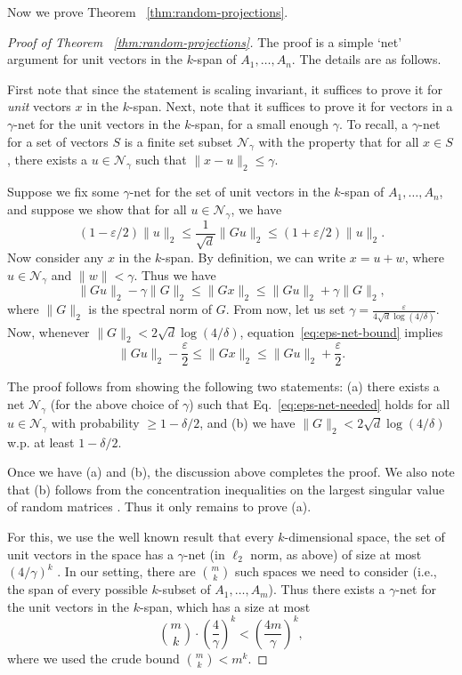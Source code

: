 \documentclass{article}
\newcommand{\eps}{\varepsilon}
\newcommand{\norm}[1]{\lVert #1 \rVert}
\newcommand{\calN}{\mathcal{N}}
\begin{document}
Now we prove Theorem ~\ref{thm:random-projections}.
\begin{proof}[Proof of Theorem ~\ref{thm:random-projections}]
The proof is a simple `net' argument for unit vectors in the $k$-span
of $A_1, \dots, A_n$.  The details are as follows.

First note that since the statement is scaling invariant, it suffices
to prove it for {\em unit} vectors $x$ in the $k$-span. Next, note
that it suffices to prove it for vectors in a $\gamma$-net for the
unit vectors in the $k$-span, for a small enough $\gamma$. To recall,
a $\gamma$-net for a set of vectors $S$ is a finite set subset
$\calN_\gamma$ with the property that for all $x \in S$, there exists a
$u \in \calN_\gamma$ such that $\norm{x - u}_2 \le \gamma$.

Suppose we fix some $\gamma$-net for the set of unit vectors in the
$k$-span of $A_1, \dots, A_n$, and suppose we show that for all $u \in
\calN_\gamma$, we have
\begin{equation}
  (1-\eps/2)\norm{u}_2 \le \frac{1}{\sqrt{d}} \norm{Gu}_2 \le (1+\eps/2) \norm{u}_2.\label{eq:eps-net-needed}
\end{equation}
Now consider any $x$ in the $k$-span. By definition, we can write $x =
u +w$, where $u \in \calN_\gamma$ and $\norm{w} <\gamma$.  Thus we
have
\begin{equation}
  \norm{Gu}_2 - \gamma \norm{G}_{2} \le \norm{Gx}_2 \le \norm{Gu}_2 + \gamma \norm{G}_2, \label{eq:eps-net-bound}
\end{equation}
where $\norm{G}_2$ is the spectral norm of $G$.  From now, let us set
$\gamma = \frac{\eps}{4\sqrt{d} \log(4/\delta)}$.  Now, whenever
$\norm{G}_2 < 2\sqrt{d}\log (4/\delta)$,
equation~\eqref{eq:eps-net-bound} implies
\[ \norm{Gu}_2 - \frac{\eps}{2} \le \norm{Gx}_2 \le \norm{Gu}_2 + \frac{\eps}{2}.\]

The proof follows from showing the following two statements: (a) there
exists a net $\calN_\gamma$ (for the above choice of $\gamma$) such
that Eq.~\eqref{eq:eps-net-needed} holds for all $u \in \calN_\gamma$
with probability $\ge 1- \delta/2$, and (b) we have $\norm{G}_2 <
2\sqrt{d}\log(4/\delta)$ w.p. at least $1-\delta/2$.

Once we have (a) and (b), the discussion above completes the proof. We
also note that (b) follows from the concentration inequalities on the
largest singular value of random matrices \cite{Rudelson}. Thus it only remains to prove (a).

For this, we use the well known result that every
$k$-dimensional space, the set of unit vectors in the space has a
$\gamma$-net (in $\ell_2$ norm, as above) of size at most
$(4/\gamma)^k$ \cite{Vershynin}. In our setting, there are $\binom{m}{k}$
such spaces we need to consider (i.e., the span of every possible
$k$-subset of $A_1, \dots, A_m$).  Thus there exists a $\gamma$-net
for the unit vectors in the $k$-span, which has a size at most
\[ \binom{m}{k} \cdot \left( \frac{4}{\gamma} \right)^k < \left( \frac{4m}{\gamma} \right)^k, \]
where we used the crude bound $\binom{m}{k} < m^k$.


\end{proof}
\end{document}
